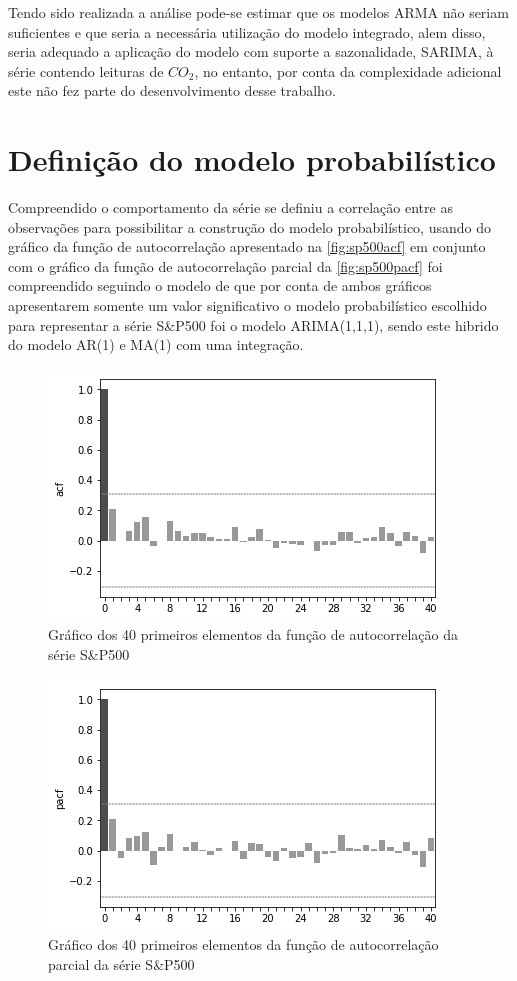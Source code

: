 \documentclass[
    12pt,
    oneside,
    a4paper,
    english,
    brazil
]{abntex2}
\begin{document}
Tendo sido realizada  a análise pode-se estimar que os  modelos ARMA não seriam
suficientes  e que  seria a  necessária  utilização do  modelo integrado,  alem
disso, seria adequado a aplicação do modelo com suporte a sazonalidade, SARIMA,
à série  contendo leituras  de $CO_2$,  no entanto,  por conta  da complexidade
adicional este não fez parte do desenvolvimento desse trabalho.

\section{Definição do modelo probabilístico}


Compreendido  o  comportamento  da  série  se definiu  a  correlação  entre  as
observações para possibilitar a construção  do modelo probabilístico, usando do
gráfico  da  função  de autocorrelação  apresentado  na  \autoref{fig:sp500acf}
em   conjunto  com   o  gráfico   da  função   de  autocorrelação   parcial  da
\autoref{fig:sp500pacf} foi compreendido seguindo  o modelo de 
que por conta  de ambos gráficos apresentarem somente um  valor significativo o
modelo probabilístico escolhido  para representar a série S\&P500  foi o modelo
ARIMA(1,1,1), sendo este hibrido do modelo AR(1) e MA(1) com uma integração.

\begin{figure}[ht]
    \centering
    \caption{Gráfico dos 40 primeiros elementos da função de autocorrelação da
    série S\&P500}\label{fig:sp500acf}
    \includegraphics[width=.5\linewidth]{images/sp500acf.png}
\end{figure}

\begin{figure}[ht]
    \centering
    \caption{Gráfico  dos 40  primeiros elementos  da função  de autocorrelação
    parcial da série S\&P500}\label{fig:sp500pacf}
    \includegraphics[width=.5\linewidth]{images/sp500pacf.png}
\end{figure}
\end{document}
